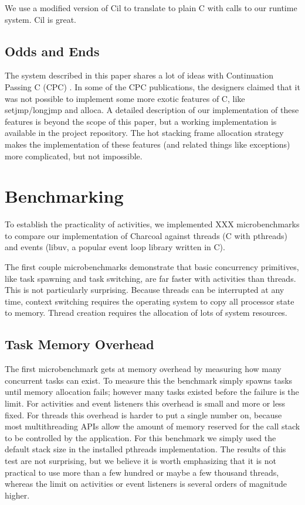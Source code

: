 \documentclass[10pt,preprint]{sigplanconf}
\begin{document}
We use a modified version of Cil \cite{Necula2002} to translate \charcoal{} to plain C with calls to our runtime system.
Cil is great.

\subsection{Odds and Ends}

The system described in this paper shares a lot of ideas with Continuation Passing C (CPC) \cite{Kerneis2013}.
In some of the CPC publications, the designers claimed that it was not possible to implement some more exotic features of C, like setjmp/longjmp and alloca.
A detailed description of our implementation of these features is beyond the scope of this paper, but a working implementation is available in the project repository.
The hot stacking frame allocation strategy makes the implementation of these features (and related things like exceptions) more complicated, but not impossible.

\section{Benchmarking}

To establish the practicality of activities, we implemented XXX microbenchmarks to compare our implementation of Charcoal against threads (C with pthreads) and events (libuv, a popular event loop library written in C).

The first couple microbenchmarks demonstrate that basic concurrency primitives, like task spawning and task switching, are far faster with activities than threads.
This is not particularly surprising.
Because threads can be interrupted at any time, context switching requires the operating system to copy all processor state to memory.
Thread creation requires the allocation of lots of system resources.

\subsection{Task Memory Overhead}

The first microbenchmark gets at memory overhead by measuring how many concurrent tasks can exist.
To measure this the benchmark simply spawns tasks until memory allocation fails; however many tasks existed before the failure is the limit.
For activities and event listeners this overhead is small and more or less fixed.
For threads this overhead is harder to put a single number on, because most multithreading APIs allow the amount of memory reserved for the call stack to be controlled by the application.
For this benchmark we simply used the default stack size in the installed pthreads implementation.
The results of this test are not surprising, but we believe it is worth emphasizing that it is not practical to use more than a few hundred or maybe a few thousand threads, whereas the limit on activities or event listeners is several orders of magnitude higher.
\end{document}
